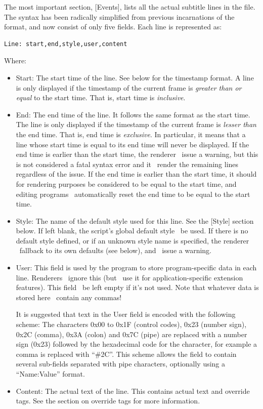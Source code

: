 \documentclass{spec}
\begin{document}
The most important section, [Events], lists all the actual subtitle lines in the file. The syntax has
been radically simplified from previous incarnations of the format, and now consist of only five fields.
Each line is represented as:

\begin{verbatim}
Line: start,end,style,user,content
\end{verbatim}

Where:

\begin{itemize}
\item Start: The start time of the line. See below for the timestamp format. A line is only displayed if
the timestamp of the current frame is \emph{greater than or equal} to the start time. That is, start
time is \emph{inclusive}.
\item End: The end time of the line. It follows the same format as the start time. The line is only
displayed if the timestamp of the current frame is \emph{lesser than} the end time. That is, end time is
\emph{exclusive}. In particular, it means that a line whose start time is equal to its end time will
never be displayed. If the end time is earlier than the start time, the renderer \should\ issue a warning,
but this is not considered a fatal syntax error and it \should\ render the remaining lines regardless of the issue.
If the end time is earlier than the start time, it should for rendering purposes be considered to be equal to
the start time, and editing programs \may\ automatically reset the end time to be equal to the start time.
\item Style: The name of the default style used for this line. See the [Style] section below. If left blank,
the script's global default style \must\ be used. If there is no default style defined, or if an unknown
style name is specified, the renderer \must\ fallback to its own defaults (see below), and \should\ issue a warning.
\item User: This field is used by the program to store program-specific data in each line. Renderers
\should\ ignore this (but \may\ use it for application-specific extension features). This field \should\
be left empty if it's not used. Note that whatever data is stored here \mustnot\ contain any commas!

It is suggested that text in the User field is encoded with the following scheme: The characters
0x00 to 0x1F (control codes), 0x23 (number sign), 0x2C (comma), 0x3A (colon) and 0x7C (pipe)
are replaced with a number sign (0x23) followed by the hexadecimal code for the character, for example
a comma is replaced with ``\#2C''. This scheme allows the field to contain several sub-fields separated
with pipe characters, optionally using a ``Name:Value'' format.
\item Content: The actual text of the line. This contains actual text and override tags. See the section
on override tags for more information.
\end{itemize}
\end{document}
